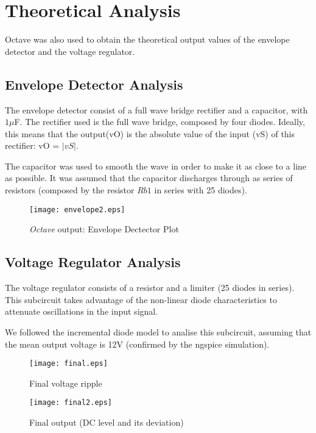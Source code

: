 \section{Theoretical Analysis} \label{sec:analysis}


Octave was also used to obtain the theoretical output values of the envelope detector and the voltage regulator. 



\subsection{Envelope Detector Analysis}

The envelope detector consist of a full wave bridge rectifier and a capacitor, with $1\mu$F.
The rectifier used is the full wave bridge, composed by four diodes. Ideally, this means that the output(vO) is the absolute value of the input (vS) of this rectifier: vO = $|vS|$.

The capacitor was used to smooth the wave in order to make it as close to a line as possible. It was assumed that the capacitor discharges through as series of resistors (composed by the resistor $Rb1$ in series with 25 diodes).



\begin{figure}[h]
    \centering
    \texttt{[image: envelope2.eps]}
    \caption{{\it Octave} output: Envelope Dectector Plot}
    \label{fig:OctaveOut}
\end{figure}



\subsection{Voltage Regulator Analysis}

The voltage regulator consists of a resistor and a limiter (25 diodes in series). This subcircuit takes advantage of the non-linear diode characteristics to attenuate oscillations in the input signal.

We followed the incremental diode model to analise this subcircuit, assuming that the mean output voltage is 12V (confirmed by the ngspice simulation).


\begin{figure}[h] \centering
  \begin{minipage}{.5\textwidth}
    \texttt{[image: final.eps]}
    \caption{Final voltage ripple}
    \label{fig:simenv}
    \end{minipage}%
  \begin{minipage}{.5\textwidth}
  \centering
    \texttt{[image: final2.eps]}
    \caption{Final output (DC level and its deviation)}
    \label{fig:compenv}
      \end{minipage}%
\end{figure}


